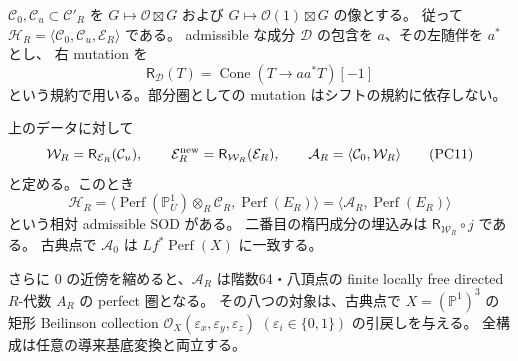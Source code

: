 $\mathcal C_0,\mathcal C_u\subset\mathcal C'_R$ を
$G\mapsto\mathcal O\boxtimes G$ および
$G\mapsto\mathcal O(1)\boxtimes G$ の像とする。
従って $\mathcal H_R=\langle\mathcal C_0,\mathcal C_u,\mathcal E_R\rangle$ である。
admissible な成分 $\mathcal D$ の包含を $a$、その左随伴を $a^*$ とし、
右 mutation を
\[
 \mathsf R_{\mathcal D}(T)
 =\operatorname{Cone}(T\longrightarrow aa^*T)[-1]
 \tag{PC10}
\]
という規約で用いる。部分圏としての mutation はシフトの規約に依存しない。

\begin{theorem}\label{pcat:two-contractions}
上のデータに対して
\[
 \mathcal W_R=\mathsf R_{\mathcal E_R}(\mathcal C_u),\qquad
 \mathcal E_R^{\rm new}=\mathsf R_{\mathcal W_R}(\mathcal E_R),\qquad
 \mathcal A_R=\langle\mathcal C_0,\mathcal W_R\rangle
 \tag{PC11}
\]
と定める。このとき
\[
 \mathcal H_R
 =\langle\operatorname{Perf}(\mathbb P^1_U)\otimes_R\mathcal C_R,
               \operatorname{Perf}(E_R)\rangle
 =\langle\mathcal A_R,\operatorname{Perf}(E_R)\rangle
 \tag{PC12}
\]
という相対 admissible SOD がある。
二番目の楕円成分の埋込みは $\mathsf R_{\mathcal W_R}\circ j$ である。
古典点で $\mathcal A_0$ は $Lf^*\operatorname{Perf}(X)$ に一致する。

さらに $0$ の近傍を縮めると、$\mathcal A_R$ は階数64・八頂点の
finite locally free directed $R$-代数 $A_R$ の perfect 圏となる。
その八つの対象は、古典点で $X=(\mathbb P^1)^3$ の矩形 Beilinson collection
$\mathcal O_X(\varepsilon_x,\varepsilon_y,\varepsilon_z)$
$(\varepsilon_i\in\{0,1\})$ の引戻しを与える。
全構成は任意の導来基底変換と両立する。
\end{theorem}

